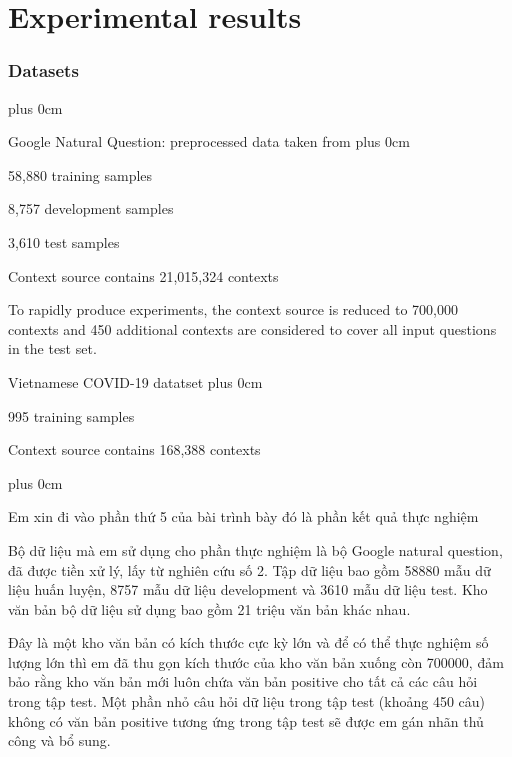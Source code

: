 \documentclass[11pt]{beamer}
\renewcommand{\raggedright}{\leftskip=0pt \rightskip=0pt plus 0cm}
\let\olditemize=\itemize
\renewenvironment{itemize}{\olditemize\raggedright}{\endlist}
\begin{document}
\section{Experimental results}
\begin{frame}
	\frametitle{Datasets}
	\begin{itemize}
		\item Google Natural Question: preprocessed data taken from \cite{dpr}
		\begin{itemize}
			\item 58,880 training samples
			\item 8,757 development samples
			\item 3,610 test samples
			\item Context source contains 21,015,324 contexts
			\item To rapidly produce experiments, the context source is reduced to 700,000 contexts and 450 additional contexts are considered to cover all input questions in the test set. 
		\end{itemize}
		\item Vietnamese COVID-19 datatset
		\begin{itemize}
			\item 995 training samples
			\item Context source contains 168,388 contexts
		\end{itemize}
	\end{itemize}
\end{frame}
\begin{frame}
\begin{itemize}
	\item Em xin đi vào phần thứ 5 của bài trình bày đó là phần kết quả thực nghiệm
	\item Bộ dữ liệu mà em sử dụng cho phần thực nghiệm là bộ Google natural question, đã được tiền xử lý, lấy từ nghiên cứu số 2. Tập dữ liệu bao gồm 58880 mẫu dữ liệu huấn luyện, 8757 mẫu dữ liệu development và 3610 mẫu dữ liệu test. Kho văn bản bộ dữ liệu sử dụng bao gồm 21 triệu văn bản khác nhau.
	\item Đây là một kho văn bản có kích thước cực kỳ lớn và để có thể thực nghiệm số lượng lớn thì em đã thu gọn kích thước của kho văn bản xuống  còn 700000, đảm bảo rằng kho văn bản mới luôn chứa văn bản positive cho tất cả các câu hỏi trong tập test. Một phần nhỏ câu hỏi dữ liệu trong tập test (khoảng 450 câu) không có văn bản positive tương ứng trong tập test sẽ được em gán nhãn thủ công và bổ sung.
\end{itemize}
\end{frame}
\end{document}
